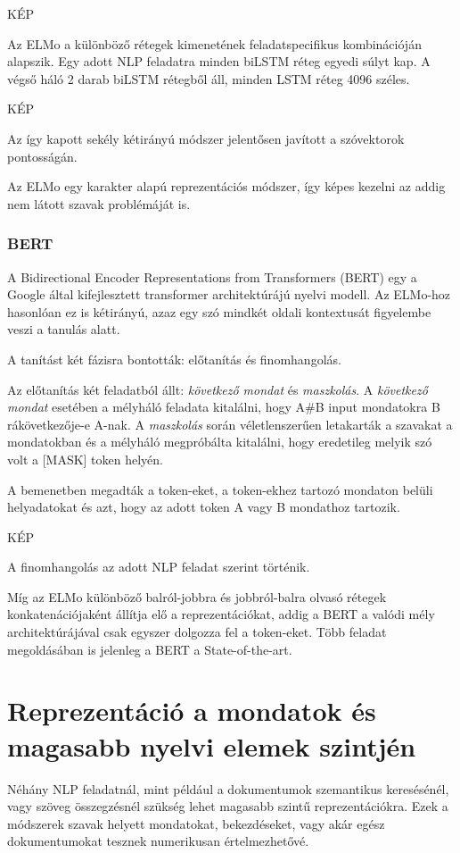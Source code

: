 KÉP

Az ELMo a különböző rétegek kimenetének feladatspecifikus kombinációján alapszik. Egy adott NLP feladatra minden biLSTM réteg egyedi súlyt kap. A végső háló 2 darab biLSTM rétegből áll, minden LSTM réteg 4096 széles.

KÉP

Az így kapott sekély kétirányú módszer jelentősen javított a szóvektorok pontosságán.

\begin{note}
	Az ELMo egy karakter alapú reprezentációs módszer, így képes kezelni az addig nem látott szavak problémáját is.
\end{note}

\subsubsection{BERT}
A Bidirectional Encoder Representations from Transformers (BERT) egy a Google által kifejlesztett transformer architektúrájú nyelvi modell. Az ELMo-hoz hasonlóan ez is kétirányú, azaz egy szó mindkét oldali kontextusát figyelembe veszi a tanulás alatt. 

A tanítást két fázisra bontották: előtanítás és finomhangolás.

Az előtanítás két feladatból állt: \textit{következő mondat} és \textit{maszkolás}. A \textit{következő mondat} esetében a mélyháló feladata kitalálni, hogy A\#B input mondatokra B rákövetkezője-e A-nak. A \textit{maszkolás} során véletlenszerűen letakarták a szavakat a mondatokban és a mélyháló megpróbálta kitalálni, hogy eredetileg melyik szó volt a [MASK] token helyén.

A bemenetben megadták a token-eket, a token-ekhez tartozó mondaton belüli helyadatokat és azt, hogy az adott token A vagy B mondathoz tartozik.

KÉP

A finomhangolás az adott NLP feladat szerint történik.

\begin{note}
	Míg az ELMo különböző balról-jobbra és jobbról-balra olvasó rétegek konkatenációjaként állítja elő a reprezentációkat, addig a BERT a valódi mély architektúrájával csak egyszer dolgozza fel a token-eket. Több feladat megoldásában is jelenleg a BERT a State-of-the-art.
\end{note}



\section{Reprezentáció a mondatok és magasabb nyelvi elemek szintjén}
Néhány NLP feladatnál, mint például a dokumentumok szemantikus keresésénél, vagy szöveg összegzésnél szükség lehet magasabb szintű reprezentációkra. Ezek a módszerek szavak helyett mondatokat, bekezdéseket, vagy akár egész dokumentumokat tesznek numerikusan értelmezhetővé. 

